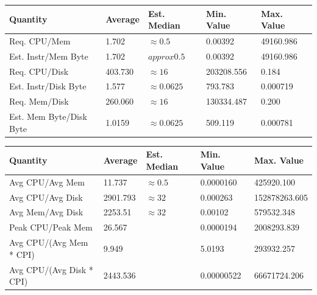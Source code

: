 \documentclass[a0,portrait]{a0poster}
\begin{document}
\begin{multicols}{2}
\begin{center}\vspace{1cm}
\begin{tabular}{| l | l l l l |} 
\toprule
\textbf{Quantity} & \textbf{Average} & \textbf{Est. Median} & \textbf{Min. Value} & \textbf{Max. Value} \\
\midrule
Req. CPU/Mem & 1.702 &  $\approx 0.5$ & 0.00392 & 49160.986  \\ \hline
Est. Instr/Mem Byte & 1.702 & $approx 0.5 $ & 0.00392 & 49160.986 \\ \hline
Req. CPU/Disk & 403.730 & $\approx 16$ & 203208.556 & 0.184 \\ \hline
Est. Instr/Disk Byte & 1.577 & $\approx 0.0625$ & 793.783 & 0.000719 \\ \hline
Req. Mem/Disk & 260.060 & $\approx 16$ & 130334.487 & 0.200 \\ \hline
Est. Mem Byte/Disk Byte & 1.0159&  $\approx 0.0625$ & 509.119 & 0.000781 \\ \hline
\bottomrule
\end{tabular}
\end{center}\vspace{1cm}

\begin{center}\vspace{1cm}
\begin{tabular}{| l | l l l l |} 
\toprule
\textbf{Quantity} & \textbf{Average} & \textbf{Est. Median} & \textbf{Min. Value} & \textbf{Max. Value} \\
\midrule
Avg CPU/Avg Mem & 11.737 & $\approx 0.5$ & 0.0000160 & 425920.100  \\ 
Avg CPU/Avg Disk & 2901.793 & $\approx 32$ & 0.000263 & 152878263.605 \\ 
Avg Mem/Avg Disk & 2253.51 & $\approx 32$ & 0.00102 & 579532.348 \\ 
Peak CPU/Peak Mem & 26.567 & & 0.0000194 & 2008293.839 \\ 
Avg CPU/(Avg Mem * CPI) & 9.949 & & 5.0193 & 293932.257 \\ 
Avg CPU/(Avg Disk * CPI) & 2443.536 & & 0.00000522 & 66671724.206 \\ 
\bottomrule
\end{tabular}
\end{center}\vspace{1cm}


\end{multicols}
\end{document}
